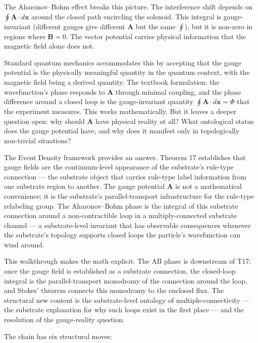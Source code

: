\documentclass[11pt,a4paper]{article}
\begin{document}
The Aharonov--Bohm effect breaks this picture. The interference shift depends on $\oint \mathbf{A} \cdot d\mathbf{x}$ around the closed path encircling the solenoid. This integral is gauge-invariant (different gauges give different $\mathbf{A}$ but the same $\oint$), but it is non-zero in regions where $\mathbf{B} = 0$. The vector potential carries physical information that the magnetic field alone does not.

Standard quantum mechanics accommodates this by accepting that the gauge potential is the physically meaningful quantity in the quantum context, with the magnetic field being a derived quantity. The textbook formulation: the wavefunction's phase responds to $\mathbf{A}$ through minimal coupling, and the phase difference around a closed loop is the gauge-invariant quantity $\oint \mathbf{A} \cdot d\mathbf{x} = \Phi$ that the experiment measures. This works mathematically. But it leaves a deeper question open: why should $\mathbf{A}$ have physical reality at all? What ontological status does the gauge potential have, and why does it manifest only in topologically non-trivial situations?

The Event Density framework provides an answer. Theorem 17 establishes that gauge fields are the continuum-level appearance of the substrate's rule-type connection --- the substrate object that carries rule-type label information from one substrate region to another. The gauge potential $\mathbf{A}$ is not a mathematical convenience; it is the substrate's parallel-transport infrastructure for the rule-type relabeling group. The Aharonov--Bohm phase is the integral of this substrate connection around a non-contractible loop in a multiply-connected substrate channel --- a substrate-level invariant that has observable consequences whenever the substrate's topology supports closed loops the particle's wavefunction can wind around.

This walkthrough makes the math explicit. The AB phase is downstream of T17: once the gauge field is established as a substrate connection, the closed-loop integral is the parallel-transport monodromy of the connection around the loop, and Stokes' theorem connects this monodromy to the enclosed flux. The structural new content is the substrate-level ontology of multiple-connectivity --- the substrate explanation for why such loops exist in the first place --- and the resolution of the gauge-reality question.

The chain has six structural moves:
\end{document}
